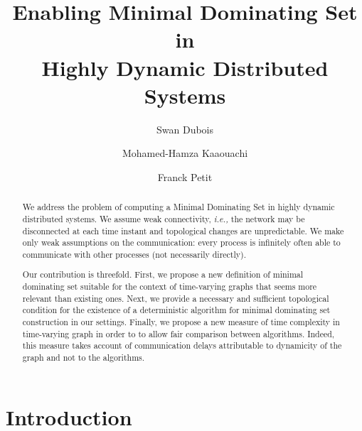 \documentclass{article}
\newcommand{\ie}{{\em i.e.,}\xspace}
\begin{document}
\title{
Enabling Minimal Dominating Set in\\Highly Dynamic Distributed Systems
}

\renewcommand*{\thefootnote}{\fnsymbol{footnote}}

\author{
Swan Dubois\footnotemark[1]
\and
Mohamed-Hamza Kaaouachi\footnotemark[1]
\and
Franck Petit\footnotemark[1]
}


\renewcommand*{\thefootnote}{\arabic{footnote}}
\setcounter{footnote}{0}

\date{}

\maketitle

\begin{abstract}
We address the problem of computing a Minimal Dominating Set in highly dynamic distributed systems. We assume weak connectivity, \ie the network may be disconnected at each time instant and topological changes are unpredictable. We make only weak assumptions on the communication: every process is infinitely often able to communicate with other processes (not necessarily directly). 

Our contribution is threefold. First, we propose a new definition of minimal dominating set suitable for the context of time-varying graphs that seems more relevant than existing ones. Next, we provide a necessary and sufficient topological condition for the existence of a deterministic algorithm for minimal dominating set construction in our settings. Finally, we propose a new measure of time complexity in time-varying graph in order to  to allow fair comparison between algorithms. Indeed, this measure takes account of communication delays attributable to dynamicity of the graph and not to the algorithms. 
\end{abstract}

\section{Introduction} 
\end{document}
